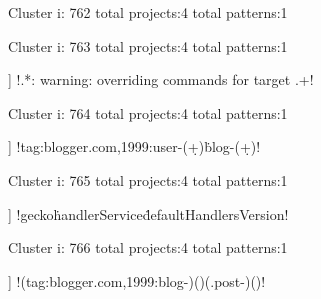 Cluster i: 762
total projects:4
total patterns:1
\begin{multicols}{1}
\end{multicols}







Cluster i: 763
total projects:4
total patterns:1
\begin{multicols}{1}
\begin{description}[noitemsep,topsep=0pt]
\item [[4] ] \cverb!.*: warning: overriding commands for target .+!
\end{description}
\end{multicols}







Cluster i: 764
total projects:4
total patterns:1
\begin{multicols}{1}
\begin{description}[noitemsep,topsep=0pt]
\item [[4] ] \cverb!tag:blogger.com,1999:user-(\d+)\.blog-(\d+)!
\end{description}
\end{multicols}







Cluster i: 765
total projects:4
total patterns:1
\begin{multicols}{1}
\begin{description}[noitemsep,topsep=0pt]
\item [[4] ] \cverb!gecko\.handlerService\.defaultHandlersVersion!
\end{description}
\end{multicols}







Cluster i: 766
total projects:4
total patterns:1
\begin{multicols}{1}
\begin{description}[noitemsep,topsep=0pt]
\item [[4] ] \cverb!(tag:blogger.com,1999:blog-)(\w*)(.post-)(\w*)!
\end{description}
\end{multicols}







